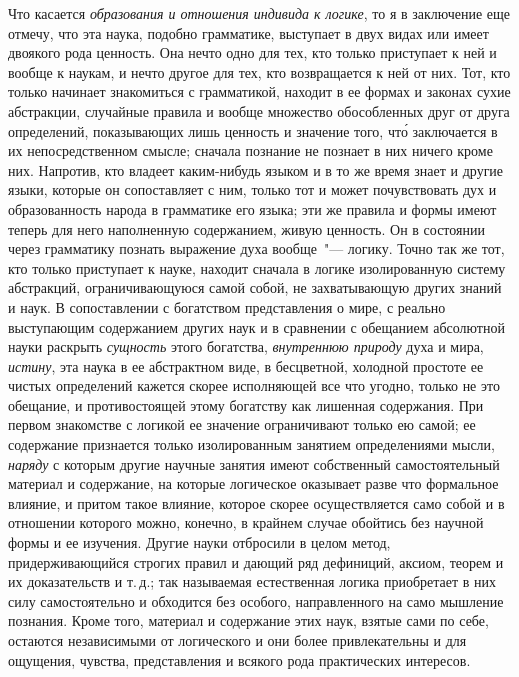 Что касается \emph{образования и отношения индивида
к логике}, то я в заключение еще отмечу, что эта наука,
подобно грамматике, выступает в двух видах или имеет
двоякого рода ценность. Она нечто одно для тех, кто
только приступает к ней и вообще к наукам, и нечто
другое для тех, кто возвращается к ней от них. Тот, кто
только начинает знакомиться с грамматикой, находит
в ее формах и законах сухие абстракции, случайные правила
и вообще множество обособленных друг от друга
определений, показывающих лишь ценность и значение
того, чт\'о заключается в их непосредственном смысле;
сначала познание не познает в них ничего кроме них.
Напротив, кто владеет каким-нибудь языком и в то же
время знает и другие языки, которые он сопоставляет
с ним, только тот и может почувствовать дух и образованность
народа в грамматике его языка; эти же правила
и формы имеют теперь для него наполненную содержанием,
живую ценность. Он в состоянии через грамматику
познать выражение духа вообще~"--- логику. Точно
так же тот, кто только приступает к науке, находит сначала
в логике изолированную систему абстракций, ограничивающуюся
самой собой, не захватывающую других
знаний и наук. В сопоставлении с богатством представления
о мире, с реально выступающим содержанием
других наук и в сравнении с обещанием абсолютной
науки раскрыть \emph{сущность} этого богатства, \emph{внутреннюю
природу} духа и мира, \emph{истину}, эта наука в ее абстрактном
виде, в бесцветной, холодной простоте ее чистых
определений кажется скорее исполняющей все что угодно,
только не это обещание, и противостоящей этому богатству
как лишенная содержания. При первом знакомстве
с логикой ее значение ограничивают только ею самой;
ее содержание признается только изолированным
занятием определениями мысли, \emph{наряду} с которым другие
научные занятия имеют собственный самостоятельный
материал и содержание, на которые логическое оказывает
разве что формальное влияние, и притом такое
влияние, которое скорее осуществляется само собой и
в отношении которого можно, конечно, в крайнем случае
обойтись без научной формы и ее изучения. Другие
науки отбросили в целом метод, придерживающийся строгих
правил и дающий ряд дефиниций, аксиом, теорем и
их доказательств и т.\,д.; так называемая естественная
логика приобретает в них силу самостоятельно и обходится
без особого, направленного на само мышление познания.
Кроме того, материал и содержание этих наук,
взятые сами по себе, остаются независимыми от логического
и они более привлекательны и для ощущения, чувства,
представления и всякого рода практических интересов.

